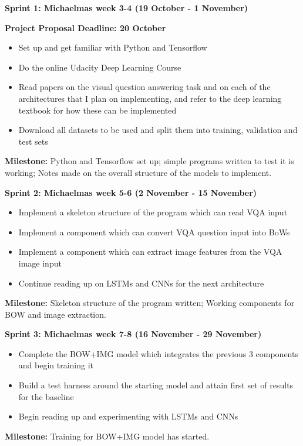\documentclass[12pt,a4paper,twoside]{article}
\begin{document}
\noindent\textbf{Sprint 1: Michaelmas week 3-4 (19 October - 1 November)}
\begin{addmargin}[3em]{0em}
		\noindent\textbf{Project Proposal Deadline: 20 October}
		\setlength{\parskip}{0em}
	\begin{itemize}
		\setlength\itemsep{0em}
		\item Set up and get familiar with Python and Tensorflow 
		\item Do the online Udacity Deep Learning Course 
		\item Read papers on the visual question answering task and on each of the architectures that I plan on implementing, and refer to the deep learning textbook for how these can be implemented
		\item Download all datasets to be used and split them into training, validation and test sets
	\end{itemize}
	\setlength{\parskip}{0em}
	\noindent\textbf{Milestone:} Python and Tensorflow set up; simple programs written to test it is working; Notes made on the overall structure of the models to implement.
	\vspace{1em}
\end{addmargin}
\newpage
\noindent\textbf{Sprint 2: Michaelmas week 5-6 (2 November - 15 November)}
\begin{addmargin}[3em]{0em}
	\begin{itemize}
		\setlength\itemsep{0em}
		\item Implement a skeleton structure of the program which can read VQA input
		\item Implement a component which can convert VQA question input into BoWs
		\item Implement a component which can extract image features from the VQA image input
		\item Continue reading up on LSTMs and CNNs for the next architecture
	\end{itemize}
		\noindent\textbf{Milestone:} Skeleton structure of the program written; Working components for BOW and image extraction.
		\setlength{\parskip}{1em}
\end{addmargin}	

\noindent\textbf{Sprint 3: Michaelmas week 7-8 (16 November - 29 November)}
\setlength{\parskip}{1em}
\begin{addmargin}[3em]{0em}
	\begin{itemize}
		\setlength\itemsep{0em}
		\item Complete the BOW+IMG model which integrates the previous 3 components and begin training it
		\item Build a test harness around the starting model and attain first set of results for the baseline
		\item Begin reading up and experimenting with LSTMs and CNNs
	\end{itemize}
	\noindent\textbf{Milestone:} Training for BOW+IMG model has started.
	\setlength{\parskip}{1em}
\end{addmargin}
\end{document}
